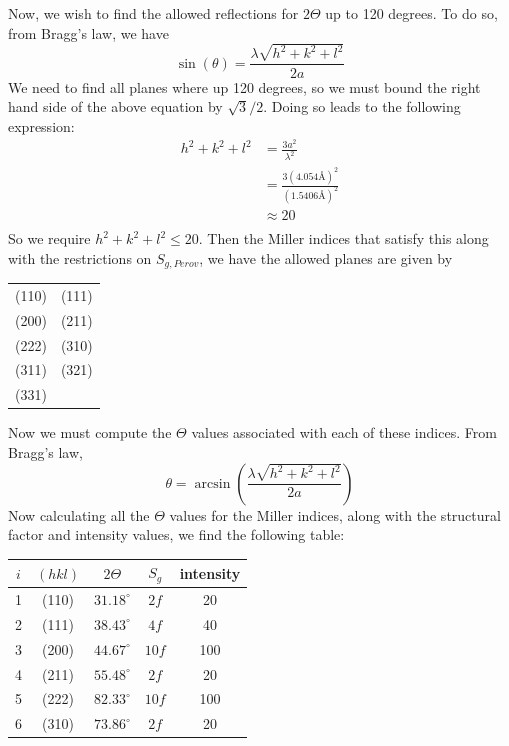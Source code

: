 \documentclass{article}
\begin{document}
\begin{enumerate}
    Now, we wish to find the allowed reflections for $2\Theta$ up to 120 degrees. To do so, from Bragg's law, we have
    \[\sin{(\theta)} = \frac{\lambda\sqrt{h^2 + k^2 + l^2}}{2a}\]
    We need to find all planes where up 120 degrees, so we must bound the right hand side of the above equation by $\sqrt{3}/2$. Doing so leads to the following expression:
    \begin{align*}
        h^2 + k^2 + l^2 &= \frac{3a^2}{\lambda^2} \\
        &= \frac{3(4.054 \text{\AA})^2}{(1.5406 \text{\AA})^2} \\
        &\approx 20 \\
    \end{align*}
    So we require $h^2 + k^2 + l^2 \leq 20$. Then the Miller indices that satisfy this along with the restrictions on $S_{g, Perov}$, we have the allowed planes are given by
    \begin{center}
    \begin{tabular}{c c}
         (110) & (111) \\
         (200) & (211) \\
         (222) & (310) \\
         (311) & (321) \\
         (331)\\
    \end{tabular}
    \end{center}
    Now we must compute the $\Theta$ values associated with each of these indices. From Bragg's law,
    \[\theta = \arcsin{\left(\frac{\lambda\sqrt{h^2 + k^2 + l^2}}{2a}\right)}\]
    Now calculating all the $\Theta$ values for the Miller indices, along with the structural factor and intensity values, we find the following table:
    \begin{center}
        \begin{tabular}{c|c|c|c|c}
             $i$ & $(hkl)$ & $2\Theta$ & $S_g$ & intensity\\
             \hline
             1 & (110) & $31.18^{\circ}$ & $2f$ & 20 \\
             2 & (111) & $38.43^{\circ}$ & $4f$ & 40 \\
             3 & (200) & $44.67^{\circ}$ & $10f$ & 100 \\
             4 & (211) & $55.48^{\circ}$ & $2f$ & 20 \\
             5 & (222) & $82.33^{\circ}$ & $10f$ & 100 \\
             6 & (310) & $73.86^{\circ}$ & $2f$ & 20 \\

\end{tabular}
\end{center}
\end{enumerate}
\end{document}

